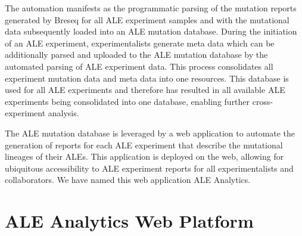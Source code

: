 \documentclass[12pt,final,masters,chapterheads]{ucsd}  %
\begin{document}
The automation manifests as the programmatic parsing of the mutation reports generated by Breseq for all ALE experiment samples and with the mutational data subsequently loaded into an ALE mutation database. During the initiation of an ALE experiment, experimentalists generate meta data which can be additionally parsed and uploaded to the ALE mutation database by the automated parsing of ALE experiment data. This process consolidates all experiment mutation data and meta data into one resources. This database is used for all ALE experiments and therefore has resulted in all available ALE experiments being consolidated into one database, enabling further cross-experiment analysis.

The ALE mutation database is leveraged by a web application to automate the generation of reports for each ALE experiment that describe the mutational lineages of their ALEs. This application is deployed on the web, allowing for ubiquitous accessibility to ALE experiment reports for all experimentalists and collaborators. We have named this web application ALE Analytics.

\section{ALE Analytics Web Platform}

%
%
\end{document}
